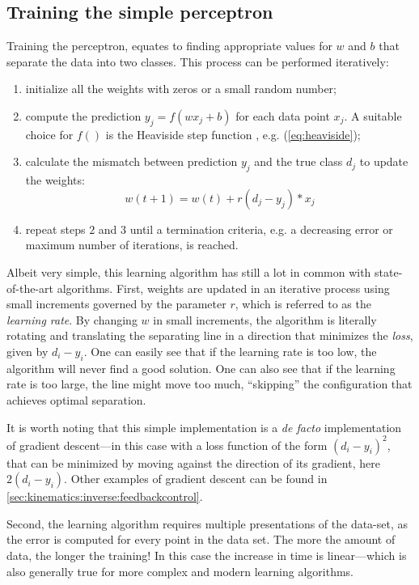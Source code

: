 \subsection{Training the simple perceptron}

Training the perceptron, equates to finding appropriate values for $w$ and $b$ that separate the data into two classes. This process can be performed iteratively:

\begin{enumerate}
\item initialize all the weights with zeros or a small random number;
\item compute the prediction $y_j=f(wx_j+b)$ for each data point $x_j$. A suitable choice for $f()$ is the Heaviside step function , e.g. (\cref{eq:heaviside});
\item calculate the mismatch between prediction $y_j$ and the true class $d_j$ to update the weights:
\begin{equation}
w(t+1)=w(t)+r(d_j-y_j)*x_j
\end{equation}
\item repeat steps $2$ and $3$ until a termination criteria, e.g. a decreasing error or maximum number of iterations, is reached.
\end{enumerate}

Albeit very simple, this learning algorithm has still a lot in common with state-of-the-art algorithms. First, weights are updated in an iterative process using small increments governed by the parameter $r$, which is referred to as the \textsl{learning rate}. By changing $w$ in small increments, the algorithm is literally rotating and translating the separating line in a direction that minimizes the \textsl{loss}, given by $d_i-y_i$. One can easily see that if the learning rate is too low, the algorithm will never find a good solution. One can also see that if the learning rate is too large, the line might move too much, ``skipping'' the configuration that achieves optimal separation.

It is worth noting that this simple implementation is a \textsl{de facto} implementation of gradient descent---in this case with a loss function of the form $(d_i-y_i)^2$, that can be minimized by moving against the direction of its gradient, here $2(d_i-y_i)$. Other examples of gradient descent can be found in \cref{sec:kinematics:inverse:feedbackcontrol}.

Second, the learning algorithm requires multiple presentations of the data-set, as the error is computed for every point in the data set. The more the amount of data, the longer the training! In this case the increase in time is linear---which is also generally true for more complex and modern learning algorithms.

